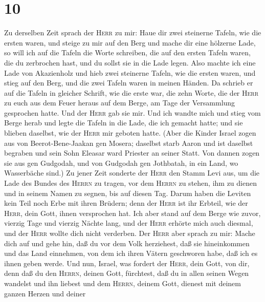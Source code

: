 \hypertarget{section-9}{%
\section{10}\label{section-9}}

 Zu derselben Zeit sprach der \textsc{Herr} zu mir: Haue
dir zwei steinerne Tafeln, wie die ersten waren, und steige zu mir auf
den Berg und mache dir eine hölzerne Lade,  so will ich
auf die Tafeln die Worte schreiben, die auf den ersten Tafeln waren, die
du zerbrochen hast, und du sollst sie in die Lade legen. 
Also machte ich eine Lade von Akazienholz und hieb zwei steinerne
Tafeln, wie die ersten waren, und stieg auf den Berg, und die zwei
Tafeln waren in meinen Händen.  Da schrieb er auf die
Tafeln in gleicher Schrift, wie die erste war, die zehn Worte, die der
\textsc{Herr} zu euch aus dem Feuer heraus auf dem Berge, am Tage der
Versammlung gesprochen hatte. Und der \textsc{Herr} gab sie mir.
 Und ich wandte mich und stieg vom Berge herab und legte
die Tafeln in die Lade, die ich gemacht hatte; und sie blieben daselbst,
wie der \textsc{Herr} mir geboten hatte.  (Aber die Kinder
Israel zogen aus von Beerot-Bene-Jaakan gen Mosera; daselbst starb Aaron
und ist daselbst begraben und sein Sohn Eleasar ward Priester an seiner
Statt.  Von dannen zogen sie aus gen Gudgodah, und von
Gudgodah gen Jothbatah, in ein Land, wo Wasserbäche sind.)
 Zu jener Zeit sonderte der \textsc{Herr} den Stamm Levi
aus, um die Lade des Bundes des \textsc{Herrn} zu tragen, vor dem
\textsc{Herrn} zu stehen, ihm zu dienen und in seinem Namen zu segnen,
bis auf diesen Tag.  Darum haben die Leviten kein Teil
noch Erbe mit ihren Brüdern; denn der \textsc{Herr} ist ihr Erbteil, wie
der \textsc{Herr}, dein Gott, ihnen versprochen hat.  Ich
aber stand auf dem Berge wie zuvor, vierzig Tage und vierzig Nächte
lang, und der \textsc{Herr} erhörte mich auch diesmal, und der
\textsc{Herr} wollte dich nicht verderben.  Der
\textsc{Herr} aber sprach zu mir: Mache dich auf und gehe hin, daß du
vor dem Volk herziehest, daß sie hineinkommen und das Land einnehmen,
von dem ich ihren Vätern geschworen habe, daß ich es ihnen geben werde.
 Und nun, Israel, was fordert der \textsc{Herr}, dein
Gott, von dir, denn daß du den \textsc{Herrn}, deinen Gott, fürchtest,
daß du in allen seinen Wegen wandelst und ihn liebest und dem
\textsc{Herrn}, deinem Gott, dienest mit deinem ganzen Herzen und deiner
